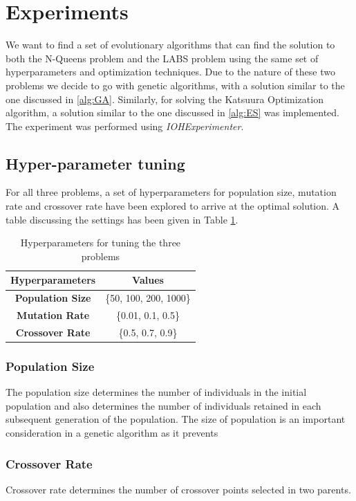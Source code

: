 \documentclass{article}
\begin{document}
\section{Experiments} \label{sec:exp-results}
We want to find a set of evolutionary algorithms that can find the solution to both the N-Queens problem and the LABS problem using the same set of hyperparameters and optimization techniques. Due to the nature of these two problems we decide to go with genetic algorithms, with a solution similar to the one discussed in \ref{alg:GA}. Similarly, for solving the Katsuura Optimization algorithm, a solution similar to the one discussed in \ref{alg:ES} was implemented.   \\
The experiment was performed using \textit{IOHExperimenter}. \cite{IOHexperimenter}
\subsection{Hyper-parameter tuning}
For all three problems, a set of hyperparameters for population size, mutation rate and crossover rate have been explored to arrive at the optimal solution. A table discussing the settings has been given in Table \ref{tab:hyperparameter-tuning}. 
\begin{table}[h!]
    \centering
    \begin{tabular}{|c|c|} \hline 
        \textbf{Hyperparameters} & \textbf{Values}  \\ \hline
        \textbf{Population Size} & \{50, 100, 200, 1000\}  \\ \hline
        \textbf{Mutation Rate}   & \{0.01, 0.1, 0.5\} \\ \hline  
        \textbf{Crossover Rate}  & \{0.5, 0.7, 0.9\} \\ \hline
    \end{tabular}
    \caption{Hyperparameters for tuning the three problems}
    \label{tab:hyperparameter-tuning}
\end{table}

\subsubsection{Population Size}
The population size determines the number of individuals in the initial population and also determines the number of individuals retained in each subsequent generation of the population. The size of population is an important consideration in a genetic algorithm as it prevents 

\subsubsection{Crossover Rate}
Crossover rate determines the number of crossover points selected in two parents.
\end{document}
